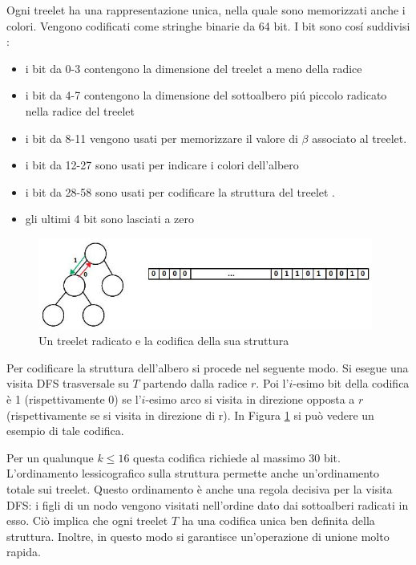 Ogni treelet ha una rappresentazione unica, nella quale sono memorizzati anche i colori.
Vengono codificati come stringhe binarie da 64 bit.
I bit sono cos\'i suddivisi : 
\begin{itemize}
	\item i bit da 0-3 contengono la dimensione del treelet a meno della radice
	\item i bit da 4-7 contengono la dimensione del sottoalbero pi\'u piccolo radicato nella radice del treelet
	\item i bit da 8-11 vengono usati per memorizzare il valore di $ \beta $ associato al treelet.
	\item i bit da 12-27 sono usati per indicare i colori dell'albero
	\item i bit da 28-58 sono usati per codificare la struttura del treelet .
	\item gli ultimi 4 bit sono lasciati a zero
\end{itemize}

		\begin{figure}[htbp]
	\centering
	\includegraphics[width=11cm]{capitolo2/grafo3}
	\caption{Un treelet radicato e la codifica della sua struttura}
	\label{figura}
\end{figure}
Per codificare la struttura dell'albero si procede nel seguente modo.
Si esegue una visita DFS trasversale su $ T $ partendo dalla radice $ r $. Poi l'$ i $-esimo bit della codifica \`e 1 (rispettivamente 0) se l'$ i $-esimo arco si visita in direzione opposta a $ r $ (rispettivamente se si visita in direzione di r). In Figura \ref{figura} si pu\`o vedere un esempio di tale codifica.

Per un qualunque $ k \le 16 $ questa codifica richiede al massimo 30 bit.
L'ordinamento lessicografico sulla struttura permette anche un'ordinamento totale sui treelet. Questo ordinamento \`e anche una regola decisiva per la visita DFS: i figli di un nodo vengono visitati nell'ordine dato dai sottoalberi radicati in esso.
Ci\`o implica che ogni treelet $ T $ ha una codifica unica ben definita della struttura. Inoltre, in questo modo si garantisce un'operazione di unione molto rapida.\\

